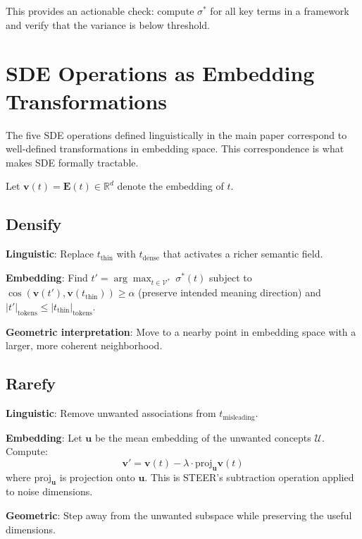 \documentclass[11pt,a4paper]{article}
\begin{document}
This provides an actionable check: compute $\sigma^*$ for all key terms in a
framework and verify that the variance is below threshold.

\section{SDE Operations as Embedding Transformations}
\label{sec:operations}

The five SDE operations defined linguistically in the main paper correspond to
well-defined transformations in embedding space. This correspondence is what
makes SDE formally tractable.

Let $\mathbf{v}(t) = \mathbf{E}(t) \in \mathbb{R}^d$ denote the embedding of $t$.

\subsection{Densify}

\textbf{Linguistic}: Replace $t_\text{thin}$ with $t_\text{dense}$ that activates
a richer semantic field.

\textbf{Embedding}: Find $t' = \arg\max_{t \in \mathcal{V}^*}\ \sigma^*(t)$
subject to $\cos(\mathbf{v}(t'), \mathbf{v}(t_\text{thin})) \geq \alpha$
(preserve intended meaning direction) and $|t'|_\text{tokens} \leq |t_\text{thin}|_\text{tokens}$.

\textbf{Geometric interpretation}: Move to a nearby point in embedding space
with a larger, more coherent neighborhood.

\subsection{Rarefy}

\textbf{Linguistic}: Remove unwanted associations from $t_\text{misleading}$.

\textbf{Embedding}: Let $\mathbf{u}$ be the mean embedding of the unwanted
concepts $\mathcal{U}$. Compute:
\[
  \mathbf{v}' = \mathbf{v}(t) - \lambda \cdot \text{proj}_{\mathbf{u}} \mathbf{v}(t)
\]
where $\text{proj}_{\mathbf{u}}$ is projection onto $\mathbf{u}$. This is
STEER's subtraction operation \cite{gomes2026steer} applied to noise dimensions.

\textbf{Geometric}: Step away from the unwanted subspace while preserving
the useful dimensions.
\end{document}
